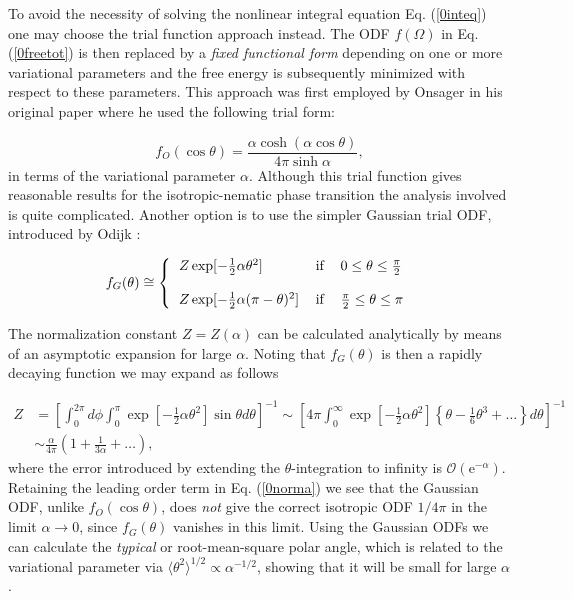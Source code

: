 {To avoid the necessity of solving the nonlinear integral equation Eq. (\ref{0inteq}) one may choose the trial function approach instead. The ODF $f(\Omega)$ in Eq. (\ref{0freetot}) is then replaced by a {\em fixed functional form} depending on one or more variational parameters and the free energy is subsequently minimized with respect to these parameters. This approach was first employed by Onsager  in his original paper \cite{onsager1949} where he used the following trial form:

\begin{equation}
f_{O}(\cos \theta) =\frac{\alpha \cosh (\alpha \cos\theta)}{4\pi\sinh \alpha},
\end{equation}
in terms of the variational parameter $\alpha$. Although this trial function gives reasonable results for the isotropic-nematic phase transition the analysis involved is
quite complicated. Another option is to use the simpler Gaussian trial ODF, introduced by Odijk \cite{OdijkLekkerkerker}:

\begin{equation}
f_{G}(\theta ) \cong   \left\{
\begin{tabular}{lll}
$Z\exp [-\frac{1}{2}\alpha\theta ^{2}]$ & if & $%
0\leq \theta \leq \frac{\pi }{2}$ \\
&  &  \\
$Z\exp [-\frac{1}{2}\alpha (\pi -\theta )^{2}]$
& if & $\frac{\pi}{2}\leq \theta \leq \pi $%
\end{tabular}
\right.  \label{0ODF}
\end{equation}

The normalization constant $Z=Z(\alpha)$ can be calculated analytically by means of an asymptotic expansion for large $\alpha$. Noting that $f_{G}(\theta)$ is then a rapidly decaying function we may expand as follows

\begin{align}
Z&=\left[\int_{0}^{2\pi} d \phi \int _{0}^{\pi} \exp \left[-\frac{1}{2}\alpha\theta ^{2}\right] \sin\theta d\theta\right]^{-1}
\sim \left[ 4\pi \int _{0}^{\infty} \exp \left[-\frac{1}{2}\alpha\theta ^{2}\right]\left\{ \theta - \frac{1}{6} \theta ^{3}+\ldots \right \}
 d\theta  \right]^{-1} \nonumber \\
&\sim \frac{\alpha}{4\pi}\left(1+\frac{1}{3\alpha}+\ldots \right), \label{0norma}
\end{align}
where the error introduced by extending  the $\theta$-integration  to infinity is $\mathcal{O}(\text{e}^{-\alpha})$. Retaining the leading order term in Eq. (\ref{0norma}) we see that the Gaussian ODF, unlike $f_{O}(\cos\theta)$, does {\em not} give the correct isotropic ODF $1/4\pi$ in the limit $\alpha \rightarrow 0$, since $f_{G}(\theta)$ vanishes in this limit. Using the Gaussian ODFs we can calculate the {\em typical} or root-mean-square polar angle, which is related to the variational parameter via $\langle\theta^{2}\rangle^{1/2}\propto  \alpha^{-1/2}$, showing that it will be small for large $\alpha$.

}
